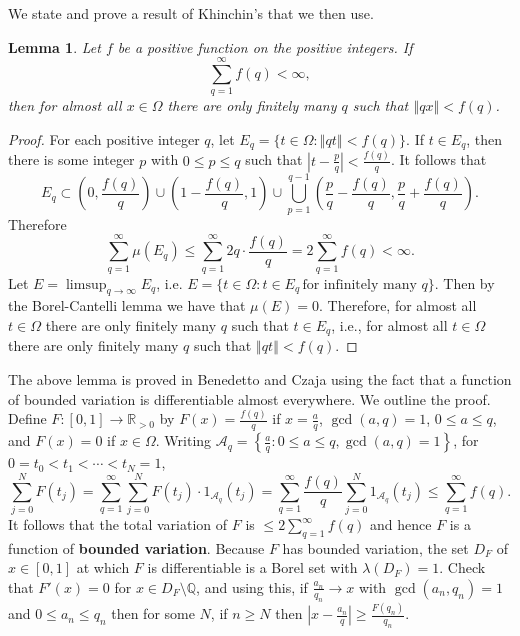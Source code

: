 \documentclass{amsart}
\newcommand{\norm}[1]{\left\Vert #1 \right\Vert}
\newtheorem{lemma}[theorem]{Lemma}
\begin{document}
We  state and prove a result of Khinchin's \cite[p.~69, Theorem 32]{MR1451873}  that we  then use. 

\begin{lemma}
Let $f$ be a positive function on the positive integers. If
\[
\sum_{q=1}^\infty f(q)<\infty,
\]
then for almost all $x \in \Omega$ there are only finitely many $q$ such that $\norm{qx}<f(q)$.
\label{khinchin}
\end{lemma}
\begin{proof}
For each positive integer $q$, let $E_q=\{t\in \Omega: \norm{qt} < f(q)\}$. If $t \in E_q$, then there is some integer $p$ with $0 \leq p  \leq q$ such that $\left| t-\frac{p}{q} \right| < \frac{f(q)}{q}$. It follows that
\[
E_q \subset \left(0,\frac{f(q)}{q} \right) \cup \left(1-\frac{f(q)}{q}, 1 \right)  \cup \bigcup_{p=1}^{q-1} \left(\frac{p}{q}-\frac{f(q)}{q},\frac{p}{q}+\frac{f(q)}{q} \right).
\]
Therefore
\[
\sum_{q=1}^\infty \mu(E_q)  \leq  \sum_{q=1}^\infty 
2q \cdot \frac{f(q)}{q}=2\sum_{q=1}^\infty f(q) < \infty.
\]
Let $E=\limsup_{q \to \infty} E_q$, i.e. $E=\{t \in \Omega : t \in E_q \, \textrm{for infinitely many $q$}\}$. Then by the Borel-Cantelli lemma \cite[p.~59, Theorem 4.3]{billingsley} we have that $\mu(E)=0$. Therefore, for almost all $t \in \Omega$ there are only finitely many $q$ such that $t \in E_q$, i.e., for almost all $t \in \Omega$ there are only finitely many $q$ such that $\norm{qt} < f(q)$.
\end{proof}

The above lemma is  proved in
Benedetto and Czaja \cite[p.~183, Theorem 4.3.3]{benedetto} using
the fact that a function of bounded variation is differentiable almost everywhere. We outline the proof. Define $F:[0,1] \to \mathbb{R}_{>0}$ by 
$F(x) = \frac{f(q)}{q}$ if $x=\frac{a}{q}$, $\gcd(a,q)=1$, $0 \leq a \leq q$, and $F(x)=0$ if $x \in \Omega$. 
Writing $\mathscr{A}_q = \left\{\frac{a}{q}: 0 \leq a \leq q, \gcd(a,q)=1\right\}$,
for $0=t_0<t_1<\cdots<t_N=1$,
\[
\sum_{j=0}^N F(t_j) =   \sum_{q=1}^\infty \sum_{j=0}^N F(t_j) \cdot 1_{\mathscr{A}_q}(t_j) = 
\sum_{q=1}^\infty \frac{f(q)}{q} \sum_{j=0}^N 1_{\mathscr{A}_q}(t_j) \leq \sum_{q=1}^\infty f(q).
\]
It follows that the total variation of $F$ is
$\leq 2 \sum_{q=1}^\infty f(q)$ and hence $F$ is a function of \textbf{bounded variation}. Because $F$ has bounded variation, the set $D_F$ of
$x \in [0,1]$ at which $F$ is differentiable is a Borel set with $\lambda(D_F)=1$. Check that $F'(x)=0$ for $x \in D_F \setminus \mathbb{Q}$, and using this,
if
$\frac{a_n}{q_n} \to x$ with $\gcd(a_n,q_n)=1$ and $0 \leq a_n \leq q_n$ then for some $N$, if $n \geq N$ then
$\left|x-\frac{a_n}{q} \right| \geq \frac{F(q_n)}{q_n}$.
\end{document}

